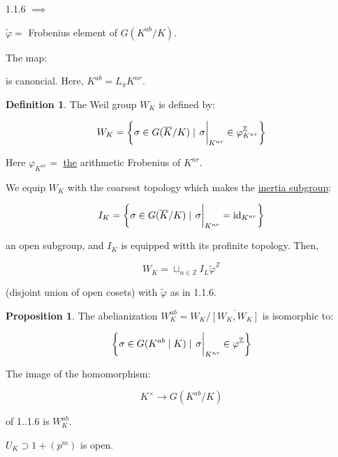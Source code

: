 \documentclass{article}
\theoremstyle{definition}
\newtheorem*{definition}{Definition}
\numberwithin{theorem}{subsection}
\newtheorem{proposition}[theorem]{Proposition}
\begin{document}
    1.1.6 \(\implies\) 

    \begin{center}
    \end{center}

    \(\widetilde{\varphi} =\) Frobenius element of \(G(K^{ab} / K)\).

    The map:

    \begin{center}
    \end{center}

    is canoncial. Here, \(K^{ab} = L_\pi K^{nr}\).

    \begin{definition}
        The Weil group \(W_K\) is defined by:

        \[
            W_K = \left\{ \sigma \in G(\overline{K} / K) \mid \eval{\sigma}_{K^{nr}} \in \varphi^\mathbb{Z}_{K^{nr}} \right\} 
        \]
    \end{definition}

    Here \(\varphi_{K^{nr}}=\) \underline{the} arithmetic Frobenius of \(K^{nr}\).

    We equip \(W_K\) with the coarsest topology which makes the \underline{inertia subgroup}:
    
    \[
        I_K = \left\{ \sigma \in G(\overline{K} / K) \mid \eval{\sigma}_{K^{nr}} = \operatorname{id}_{K^{nr}} \right\}
    \]

    an open subgroup, and \(I_K\) is equipped witth its profinite topology. Then,

    \[
        W_K = \sqcup_{n\in\mathbb{Z}} I_L \widetilde{\varphi}^\mathbb{Z}
    \]

    (disjoint union of open cosets) with \(\widetilde{\varphi}\) as in 1.1.6. 

    \begin{proposition}
        The abelianization \(W_K^{ab} = W_K / \overline{[W_K, W_K]}\) is isomorphic to:

        \[
            \left\{ \sigma \in G (K^{ab} \mid K) \mid \eval{\sigma}_{K^{nr}} \in \varphi^\mathbb{Z}  \right\} 
        \]

        The image of the homomorphism:

        \[
            K^\times \to G(K^{ab} / K)
        \]

        of 1..1.6 is \(W_K^{ab}\).

        \(U_K \supset 1 + (p^m)\) is open.
    \end{proposition}
\end{document}
